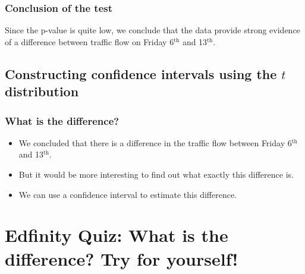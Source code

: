 \documentclass[slidestop,compress,mathserif]{beamer}
\begin{document}


\begin{frame}
\frametitle{Conclusion of the test}


\pause

Since the p-value is quite low, we conclude that the data provide strong evidence of a difference between traffic flow on Friday 6$^{\text{th}}$ and 13$^{\text{th}}$.

\end{frame}


\subsection{Constructing confidence intervals using the $t$ distribution}


\begin{frame}
\frametitle{What is the difference?}

\begin{itemize}

\item We concluded that there is a difference in the traffic flow between Friday 6$^{\text{th}}$ and 13$^{\text{th}}$.

\pause

\item But it would be more interesting to find out what exactly this difference is.

\pause

\item We can use a confidence interval to estimate this difference.

\end{itemize}

\end{frame}


\section{Edfinity Quiz: What is the difference? Try for yourself!}

\end{document}
